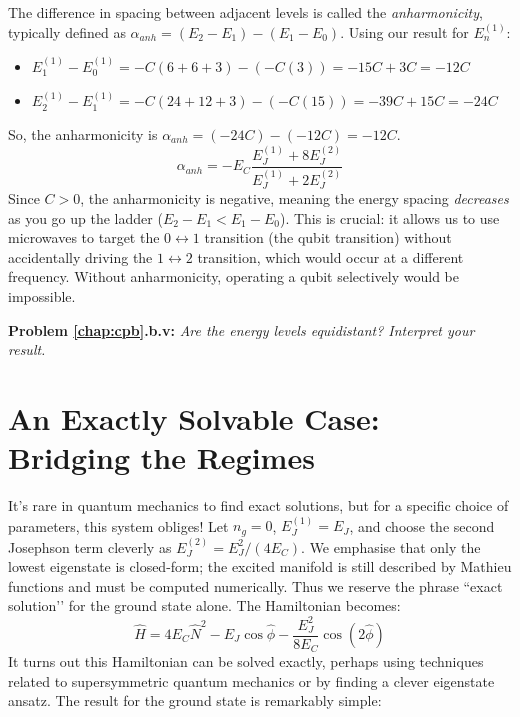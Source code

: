 \documentclass{book}
\newenvironment{problem}[1][Problem]{\par\medskip\noindent\textbf{#1:}\em}{\par\medskip}
\begin{document}
The difference in spacing between adjacent levels is called the \textit{anharmonicity}, typically defined as \(\alpha_{anh} = (E_2 - E_1) - (E_1 - E_0)\). Using our result for \(E_n^{(1)}\):
\begin{itemize}
    \item \(E_1^{(1)} - E_0^{(1)} = -C(6+6+3) - (-C(3)) = -15C + 3C = -12C\)
    \item \(E_2^{(1)} - E_1^{(1)} = -C(24+12+3) - (-C(15)) = -39C + 15C = -24C\)
\end{itemize}
So, the anharmonicity is \(\alpha_{anh} = (-24C) - (-12C) = -12C\).
\[ \alpha_{anh} = - E_C \frac{E_J^{(1)} + 8 E_J^{(2)}}{E_J^{(1)} + 2 E_J^{(2)}} \]
Since \(C > 0\), the anharmonicity is negative, meaning the energy spacing \textit{decreases} as you go up the ladder (\(E_2-E_1 < E_1-E_0\)). This is crucial: it allows us to use microwaves to target the \(0 \leftrightarrow 1\) transition (the qubit transition) without accidentally driving the \(1 \leftrightarrow 2\) transition, which would occur at a different frequency. Without anharmonicity, operating a qubit selectively would be impossible.

\begin{problem}[Problem \ref{chap:cpb}.b.v] 
Are the energy levels equidistant? Interpret your result.
\end{problem}

\section{An Exactly Solvable Case: Bridging the Regimes}
\label{sec:exact_solution}

It's rare in quantum mechanics to find exact solutions, but for a specific choice of parameters, this system obliges! Let \(n_g = 0\), \(E_J^{(1)} = E_J\), and choose the second Josephson term cleverly as \(E_J^{(2)} = E_J^2 / (4 E_C)\).
We emphasise that only the lowest eigenstate is closed-form; the excited manifold is still described by Mathieu functions and must be computed numerically.  Thus we reserve the phrase “exact solution’’ for the ground state alone.
The Hamiltonian becomes:
\[ \hat{H} = 4 E_C \hat{N}^2 - E_J \cos \hat{\phi} - \frac{E_J^2}{8 E_C} \cos (2 \hat{\phi}) \]
It turns out this Hamiltonian can be solved exactly, perhaps using techniques related to supersymmetric quantum mechanics or by finding a clever eigenstate ansatz. The result for the ground state is remarkably simple:
\end{document}
